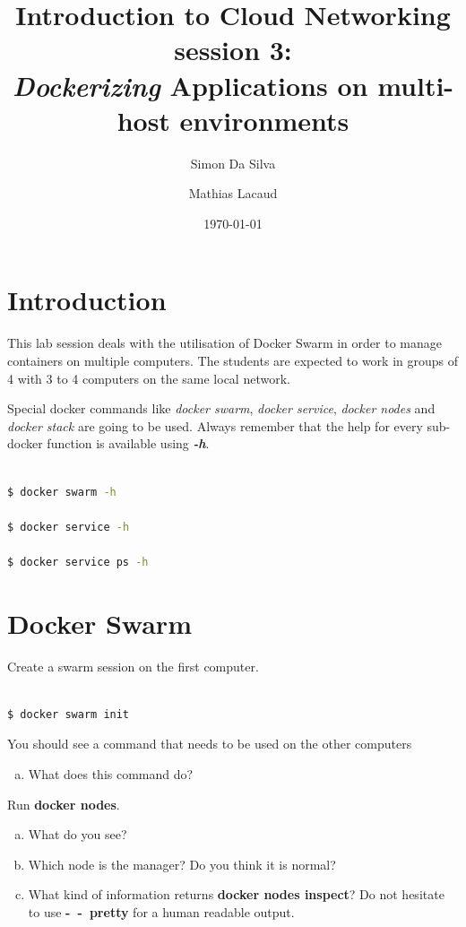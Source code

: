 \documentclass[a4paper,11pt]{exam}
\date{\today}
\title{Introduction to Cloud Networking session 3: \\
\textit{Dockerizing} Applications on multi-host environments}
\author{Simon Da Silva \and Mathias Lacaud}
\begin{document}
	
	

\maketitle

\section{Introduction}
This lab session deals with the utilisation of Docker Swarm in order 
to manage containers on multiple computers.
The students are expected to work in groups of 4 with 3 to 4 computers on the same local network. 

Special docker commands like \textit{docker swarm}, \textit{docker service},
 \textit{docker nodes} and \textit{docker stack} are going to be used. 
 Always remember that the help for every sub-docker function is available
  using \textit{\textbf{-h}}.

\begin{lstlisting}[frame=single,language={sh}]  % Start your code-block

$ docker swarm -h

$ docker service -h 

$ docker service ps -h

\end{lstlisting}

\section{Docker Swarm}

Create a swarm session on the first computer.

\begin{lstlisting}[frame=single,language={sh}]  % Start your code-block

$ docker swarm init

\end{lstlisting}

\begin{questions}
	\question You should see a command that needs to be used on the other computers
	\begin{enumerate}[(a)]
		\item What does this command do?
	\end{enumerate}
Run \textbf{docker nodes}.
	\begin{enumerate}[(b)]
		\item What do you see?
		\item Which node is the manager? Do you think it is normal?
		\item What kind of information returns \textbf{docker nodes inspect}? Do not hesitate to use \textbf{-~-~pretty} for a human readable output.
	\end{enumerate}
\end{questions}
\end{document}
